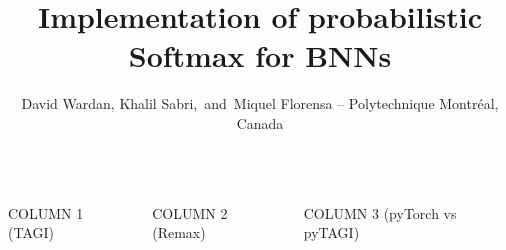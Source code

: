 \documentclass[final]{beamer}
\title{Implementation of probabilistic Softmax for BNNs}
\author{David Wardan, Khalil Sabri, \,and\, Miquel Florensa  -- Polytechnique Montr\'{e}al, Canada}
\institute[shortinst]{}
\begin{document}
\begin{frame}[t]

\begin{columns}
\begin{column}[T]{.31\textwidth}

{\Large COLUMN 1 (TAGI)}


\end{column}
\begin{column}[T]{.31\textwidth}

{\Large COLUMN 2 (Remax)}


\end{column}
\begin{column}[T]{.31\textwidth}

{\Large COLUMN 3 (pyTorch vs pyTAGI)}


\end{column}
\end{columns}
\end{frame}
\end{document}

